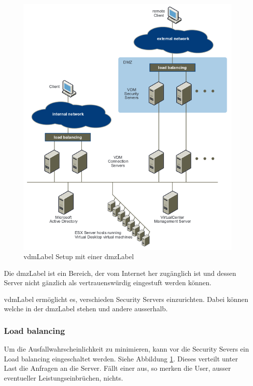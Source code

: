 \begin{figure}[H]
	\includegraphics[width=\textwidth]{images/vmware-vdm-dmz2}
	\caption{\Gls{vdmLabel} Setup mit einer \Gls{dmzLabel}}
	\label{fig:vdmSetupDmz}
\end{figure}

Die \Gls{dmzLabel} ist ein Bereich, der vom Internet her zugänglich ist und dessen Server nicht gänzlich als vertrauenswürdig eingestuft werden können.

\Gls{vdmLabel} ermöglicht es, verschieden Security Servers einzurichten. Dabei können welche in der \Gls{dmzLabel} stehen und andere ausserhalb.

\subsubsection{Load balancing}
Um die Ausfallwahrscheinlichkeit zu minimieren, kann vor die Security Severs ein Load balancing eingeschaltet werden. Siehe Abbildung \ref{fig:vdmSetupDmz}. Dieses verteilt unter Last die Anfragen an die Server. Fällt einer aus, so merken die User, ausser eventueller Leistungseinbrüchen, nichts. 

